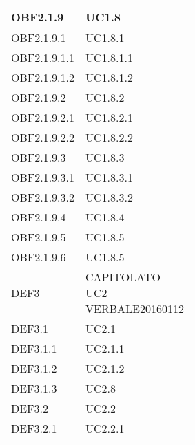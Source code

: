 \documentclass{scalatekids-article}
\begin{document}
\begin{longtable}[H]{|p{5.5cm}|p{5.5cm}|}
\hline
OBF2.1.9 & \multiLineCell[t]{UC1.8\\}\\
\hline
OBF2.1.9.1 & \multiLineCell[t]{UC1.8.1\\}\\
\hline
OBF2.1.9.1.1 & \multiLineCell[t]{UC1.8.1.1\\}\\
\hline
OBF2.1.9.1.2 & \multiLineCell[t]{UC1.8.1.2\\}\\
\hline
OBF2.1.9.2 & \multiLineCell[t]{UC1.8.2\\}\\
\hline
OBF2.1.9.2.1 & \multiLineCell[t]{UC1.8.2.1\\}\\
\hline
OBF2.1.9.2.2 & \multiLineCell[t]{UC1.8.2.2\\}\\
\hline
OBF2.1.9.3 & \multiLineCell[t]{UC1.8.3\\}\\
\hline
OBF2.1.9.3.1 & \multiLineCell[t]{UC1.8.3.1\\}\\
\hline
OBF2.1.9.3.2 & \multiLineCell[t]{UC1.8.3.2\\}\\
\hline
OBF2.1.9.4 & \multiLineCell[t]{UC1.8.4\\}\\
\hline
OBF2.1.9.5 & \multiLineCell[t]{UC1.8.5\\}\\
\hline
OBF2.1.9.6 & \multiLineCell[t]{UC1.8.5\\}\\
\hline
DEF3 & \multiLineCell[t]{CAPITOLATO\\UC2\\VERBALE20160112\\}\\
\hline
DEF3.1 & \multiLineCell[t]{UC2.1\\}\\
\hline
DEF3.1.1 & \multiLineCell[t]{UC2.1.1\\}\\
\hline
DEF3.1.2 & \multiLineCell[t]{UC2.1.2\\}\\
\hline
DEF3.1.3 & \multiLineCell[t]{UC2.8\\}\\
\hline
DEF3.2 & \multiLineCell[t]{UC2.2\\}\\
\hline
DEF3.2.1 & \multiLineCell[t]{UC2.2.1\\}\\

\end{longtable}
\end{document}
